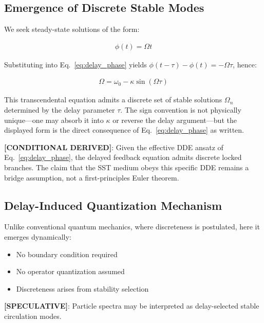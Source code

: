 \documentclass[11pt]{article}
\theoremstyle{definition}
\theoremstyle{plain}
\theoremstyle{remark}
\begin{document}
    \subsection{Emergence of Discrete Stable Modes}
        
        We seek steady-state solutions of the form:
        
        \begin{align}
            \phi(t) = \Omega t
        \end{align}
        
        Substituting into Eq.~\ref{eq:delay_phase} yields $\phi(t-\tau)-\phi(t)=-\Omega\tau$, hence:
        
        \begin{align}
            \Omega = \omega_0 - \kappa \sin(\Omega \tau)
            \label{eq:mode_condition}
        \end{align}
        
        This transcendental equation admits a discrete set of stable solutions $\Omega_n$ determined by the delay parameter $\tau$. The sign convention is not physically unique---one may absorb it into $\kappa$ or reverse the delay argument---but the displayed form is the direct consequence of Eq.~\eqref{eq:delay_phase} as written.
        
        \textbf{[CONDITIONAL DERIVED]}: Given the effective DDE ansatz of Eq.~\eqref{eq:delay_phase}, the delayed feedback equation admits discrete locked branches. The claim that the SST medium obeys this specific DDE remains a bridge assumption, not a first-principles Euler theorem.
    
    \subsection{Delay-Induced Quantization Mechanism}
        
        Unlike conventional quantum mechanics, where discreteness is postulated, here it emerges dynamically:
        
        \begin{itemize}
            \item No boundary condition required
            \item No operator quantization assumed
            \item Discreteness arises from stability selection
        \end{itemize}
        
        \textbf{[SPECULATIVE]}: Particle spectra may be interpreted as delay-selected stable circulation modes.
    
\end{document}
